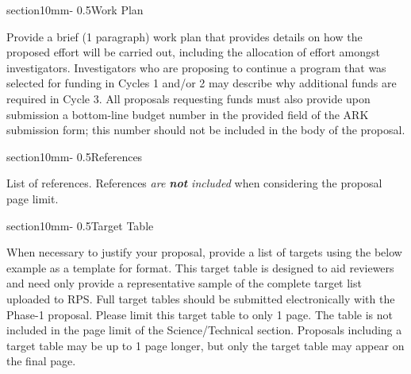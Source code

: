 \documentclass[letterpaper,11pt]{article}
\makeatletter
\renewcommand{\section}{\@startsection%
{section}{1}{0mm}{-\baselineskip}%
{0.5\baselineskip}{\normalfont\Large\bfseries}}%
\makeatother
\begin{document}
\section{Work Plan}

Provide a brief (1 paragraph) work plan that provides details on how
the proposed effort will be carried out, including the allocation of
effort amongst investigators. Investigators who are proposing to
continue a program that was selected for funding in Cycles 1 and/or 2 may
describe why additional funds are required in Cycle 3. All proposals
requesting funds must also provide upon submission a bottom-line
budget number in the provided field of the ARK submission form; this
number should not be included in the body of the proposal. 

\section{References}

List of references. References {\it are {\bf not} included} when considering the
proposal page limit.


\section{Target Table}

When necessary to justify your proposal, provide a list of targets using the below example as a template for format. This target table is designed to aid reviewers and need only provide a representative sample of the complete target list uploaded to RPS. Full target tables should be submitted electronically with the Phase-1 proposal. Please limit this target table to only 1 page. The table is not included in the page limit of the Science/Technical section. Proposals including a target table may be up to 1 page longer, but only the target table may appear on the final page.
\end{document}
